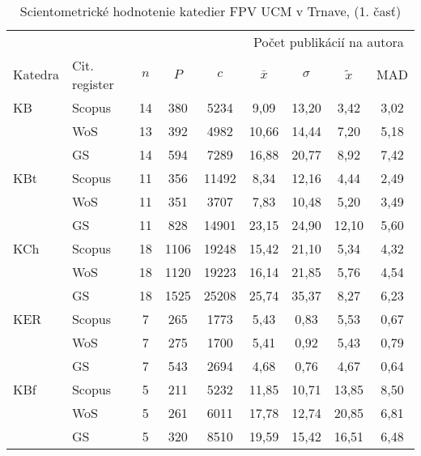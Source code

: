 \
\begin{table}
  \centering\small
  \caption[Hodnotenie FPV\,--\,počet publikácií na autora]{Scientometrické hodnotenie katedier FPV UCM v Trnave, (1. časť)}
  \label{tab:1-staff.results}
  \begin{tabularx}{\textwidth}{lXc@{\hspace{2.5em}}c@{\hspace{2.5em}}c@{\hspace{3.5em}}cccc}
  \toprule\noalign{\vspace{.3ex}}
         &        &   &     &      & \multicolumn{4}{c}{Počet publikácií na autora}  \\
 Katedra & Cit. register  & $n$   & $P$     &  $c$     & $\bar{x}$      & $\sigma$  & $\tilde{x}$   & MAD  \\[0.3ex]
\midrule\noalign{\vspace{.5ex}}
 KB   & Scopus & 14 & 380  & 5234  & 9,09          & 13,20 & 3,42  & 3,02 \\
      & WoS    & 13 & 392  & 4982  & 10,66         & 14,44 & 7,20  & 5,18 \\
      & GS     & 14 & 594  & 7289  & 16,88         & 20,77 & 8,92  & 7,42 \\[3ex]
 KBt  & Scopus & 11 & 356  & 11492 & 8,34          & 12,16 & 4,44  & 2,49 \\
      & WoS    & 11 & 351  & 3707  & 7,83          & 10,48 & 5,20  & 3,49 \\
      & GS     & 11 & 828  & 14901 & 23,15         & 24,90 & 12,10 & 5,60 \\[3ex]
 KCh  & Scopus & 18 & 1106 & 19248 & 15,42         & 21,10 & 5,34  & 4,32 \\
      & WoS    & 18 & 1120 & 19223 & 16,14         & 21,85 & 5,76  & 4,54 \\
      & GS     & 18 & 1525 & 25208 & 25,74         & 35,37 & 8,27  & 6,23 \\[3ex]
 KER  & Scopus & 7  & 265  & 1773  & 5,43          & 0,83  & 5,53  & 0,67 \\
      & WoS    & 7  & 275  & 1700  & 5,41          & 0,92  & 5,43  & 0,79 \\
      & GS     & 7  & 543  & 2694  & 4,68          & 0,76  & 4,67  & 0,64 \\[3ex]
 KBf  & Scopus & 5  & 211  & 5232  & 11,85         & 10,71 & 13,85 & 8,50 \\
      & WoS    & 5  & 261  & 6011  & 17,78         & 12,74 & 20,85 & 6,81 \\
      & GS     & 5  & 320  & 8510  & 19,59         & 15,42 & 16,51 & 6,48 \\[3ex]

\end{tabularx}
\end{table}
